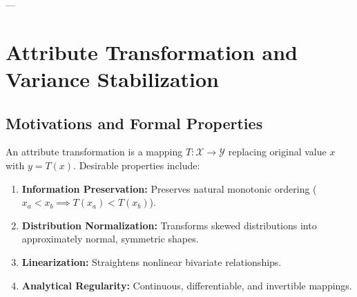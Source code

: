 \FloatBarrier

---

\section{Attribute Transformation and Variance Stabilization}

\subsection{Motivations and Formal Properties}
An attribute transformation is a mapping $T: \mathcal{X} \to \mathcal{Y}$ replacing original value $x$ with $y = T(x)$. Desirable properties include:
\begin{enumerate}
    \item \textbf{Information Preservation:} Preserves natural monotonic ordering ($x_a < x_b \implies T(x_a) < T(x_b)$).
    \item \textbf{Distribution Normalization:} Transforms skewed distributions into approximately normal, symmetric shapes.
    \item \textbf{Linearization:} Straightens nonlinear bivariate relationships.
    \item \textbf{Analytical Regularity:} Continuous, differentiable, and invertible mappings.
\end{enumerate}

